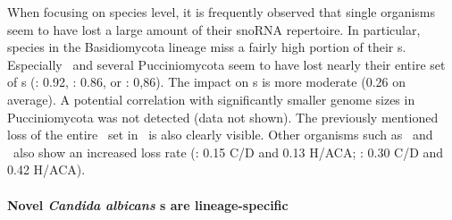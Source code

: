 When focusing on species level, it is frequently observed that single
organisms seem to have lost a large amount of their snoRNA repertoire. In
particular, species in the Basidiomycota lineage miss a fairly high
portion of their \sno s. Especially \wse\ and several Pucciniomycota
seem to have lost nearly their entire set of \haca s (\wse: 0.92, \rmi: 0.86,
or \sli: 0,86). The impact on \cd s is more moderate (0.26 on
average). A potential correlation with significantly smaller genome
sizes in Pucciniomycota was not detected (data not shown). The
previously mentioned loss of the entire \haca\ set in \Ptt\ is also clearly
visible. Other organisms such
as \pan\ and  \opi\ also show an increased loss rate (\pan: 0.15 C/D
and 0.13 H/ACA; \opi: 0.30 C/D and 0.42 H/ACA). 


\paragraph{\textbf{Novel \emph{Candida albicans} \sno s are lineage-specific}}

